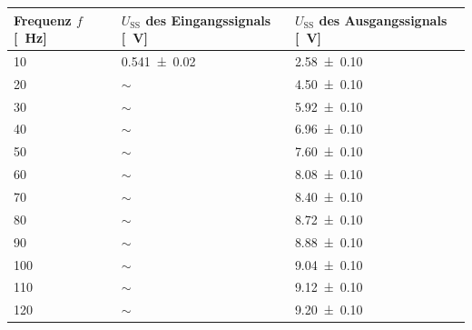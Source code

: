     \begin{center}
        \captionsetup{type=table}
        \begin{adjustbox}{max width=\linewidth, keepaspectratio}
            \begin{tabular}{lll}
            \toprule
            Frequenz $f$ [\SI{}{\hertz}] & $U_{\text{SS}}$ des Eingangssignals [\SI{}{\volt}] & $U_{\text{SS}}$ des Ausgangssignals [\SI{}{\volt}] \\
            \midrule
            \SI{10}{}                    & \SI{0,541 \pm 0,02}{}                              & \SI{2,58 \pm 0,10}{}                               \\
            \SI{20}{}                    & $\sim$                                             & \SI{4,50 \pm 0,10}{}                               \\
            \SI{30}{}                    & $\sim$                                             & \SI{5,92 \pm 0,10}{}                               \\
            \SI{40}{}                    & $\sim$                                             & \SI{6,96 \pm 0,10}{}                               \\
            \SI{50}{}                    & $\sim$                                             & \SI{7,60 \pm 0,10}{}                               \\
            \SI{60}{}                    & $\sim$                                             & \SI{8,08 \pm 0,10}{}                               \\
            \SI{70}{}                    & $\sim$                                             & \SI{8,40 \pm 0,10}{}                               \\
            \SI{80}{}                    & $\sim$                                             & \SI{8,72 \pm 0,10}{}                               \\
            \SI{90}{}                    & $\sim$                                             & \SI{8,88 \pm 0,10}{}                               \\
            \SI{100}{}                   & $\sim$                                             & \SI{9,04 \pm 0,10}{}                               \\
            \SI{110}{}                   & $\sim$                                             & \SI{9,12 \pm 0,10}{}                               \\
            \SI{120}{}                   & $\sim$                                             & \SI{9,20 \pm 0,10}{}                               \\

\end{tabular}
\end{adjustbox}
\end{center}
